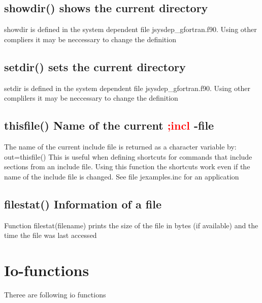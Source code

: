 \subsection{\textcolor{VioletRed}{showdir}() shows the current directory}
\label{showdir}
\begin{note}
showdir is defined in the system dependent file jsysdep\_gfortran.f90.
Using other compliers it may be neccessary to change the definition
\end{note}
\subsection{\textcolor{VioletRed}{setdir}() sets the current directory}
\label{setdir}
\begin{note}
setdir is defined in the system dependent file jsysdep\_gfortran.f90.
Using other complilers it may be neccessary to change the definition
\end{note}
\subsection{\textcolor{VioletRed}{thisfile}() Name of the current \textcolor{Red}{;incl} -file}
\label{thisfile}
The name of the current include file is returned as a character variable by:
out=\textcolor{VioletRed}{thisfile}()
This is useful when defining shortcuts for commands that include sections from an include file.
Using this function the shortcuts work even if the name of the include file is changed. See file
jexamples.inc for an application
\subsection{\textcolor{VioletRed}{filestat}() Information of a file}
\label{filestat}
Function \textcolor{VioletRed}{filestat}(filename) prints the size of the
file in bytes (if available) and the time the file was last accessed
\section{Io-functions}
\label{io}
Theree are following io functions
